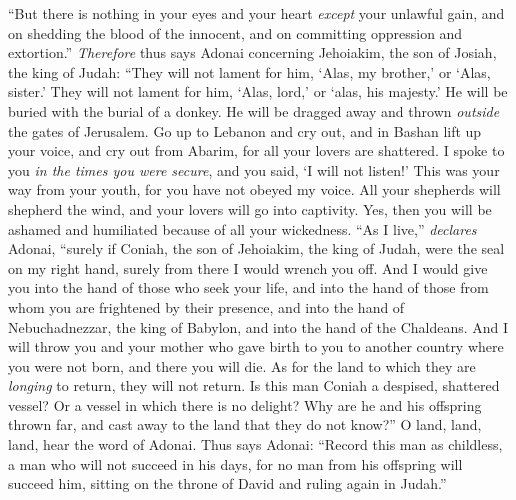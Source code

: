 \begin{biblechapter}
\verse “But there is nothing in your eyes and your heart 
\textit{except} your unlawful gain, 
and on shedding the blood of the innocent, 
and on committing oppression and extortion.”
\verse \textit{Therefore} thus says Adonai concerning Jehoiakim, the son of Josiah, the king of Judah:
\verse “They will not lament for him, 
‘Alas, my brother,’ or ‘Alas, sister.’ 
They will not lament for him, 
‘Alas, lord,’ or ‘alas, his majesty.’
\verse He will be buried with the burial of a donkey. 
He will be dragged away and thrown \textit{outside} the gates of Jerusalem.
\verse Go up to Lebanon and cry out, 
and in Bashan lift up your voice, 
and cry out from Abarim, 
for all your lovers are shattered.
\verse I spoke to you \textit{in the times you were secure}, 
and you said, ‘I will not listen!’ 
This was your way from your youth, 
for you have not obeyed my voice.
\verse All your shepherds will shepherd the wind, 
and your lovers will go into captivity. 
Yes, then you will be ashamed and humiliated 
because of all your wickedness.
\verse “As I live,” \textit{declares} Adonai, “surely if Coniah, the son of Jehoiakim, the king of Judah, were the seal on my right hand, surely from there I would wrench you off.
\verse And I would give you into the hand of those who seek your life, and into the hand of those from whom you are frightened by their presence, and into the hand of Nebuchadnezzar, the king of Babylon, and into the hand of the Chaldeans.
\verse And I will throw you and your mother who gave birth to you to another country where you were not born, and there you will die.
\verse As for the land to which they are \textit{longing} to return, they will not return.
\verse Is this man Coniah a despised, shattered vessel? 
Or a vessel in which there is no delight? 
Why are he and his offspring thrown far, 
and cast away to the land that they do not know?”
\verse O land, land, land, hear the word of Adonai.
\verse Thus says Adonai: “Record this man as childless, 
a man who will not succeed in his days, 
for no man from his offspring will succeed him, 
sitting on the throne of David and ruling again in Judah.”
\end{biblechapter}

